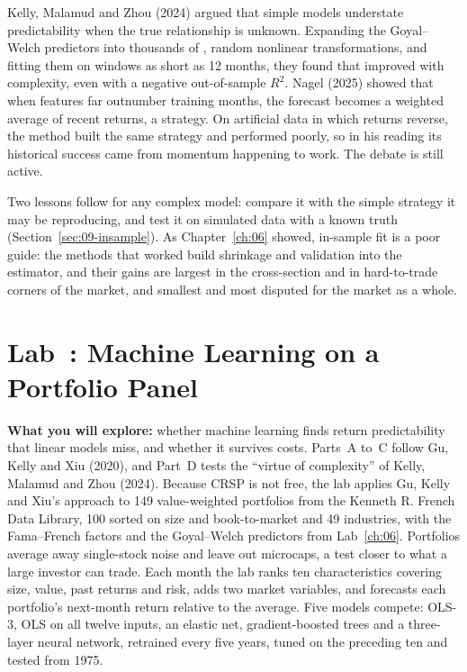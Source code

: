 Kelly, Malamud and Zhou (2024) argued that simple models understate predictability when the true relationship is unknown. Expanding the Goyal--Welch predictors into thousands of , random nonlinear transformations, and fitting them on windows as short as 12 months, they found that  improved with complexity, even with a negative out-of-sample $R^2$. Nagel (2025) showed that when features far outnumber training months, the forecast becomes a weighted average of recent returns, a  strategy. On artificial data in which returns reverse, the method built the same strategy and performed poorly, so in his reading its historical success came from momentum happening to work. The debate is still active.

Two lessons follow for any complex model: compare it with the simple strategy it may be reproducing, and test it on simulated data with a known truth (Section~\ref{sec:09-insample}). As Chapter~\ref{ch:06} showed, in-sample fit is a poor guide: the methods that worked build shrinkage and validation into the estimator, and their gains are largest in the cross-section and in hard-to-trade corners of the market, and smallest and most disputed for the market as a whole.

\section{Lab~\thechapter: Machine Learning on a Portfolio Panel}
\label{sec:20-lab}

\textbf{What you will explore:} whether machine learning finds return predictability that linear models miss, and whether it survives costs. Parts~A to~C follow Gu, Kelly and Xiu (2020), and Part~D tests the ``virtue of complexity'' of Kelly, Malamud and Zhou (2024). Because CRSP is not free, the lab applies Gu, Kelly and Xiu's approach to 149 value-weighted portfolios from the Kenneth R. French Data Library, 100 sorted on size and book-to-market and 49 industries, with the Fama--French factors and the Goyal--Welch predictors from Lab~\ref{ch:06}. Portfolios average away single-stock noise and leave out microcaps, a test closer to what a large investor can trade. Each month the lab ranks ten characteristics covering size, value, past returns and risk, adds two market variables, and forecasts each portfolio's next-month return relative to the average. Five models compete: OLS-3, OLS on all twelve inputs, an elastic net, gradient-boosted trees and a three-layer neural network, retrained every five years, tuned on the preceding ten and tested from 1975.

